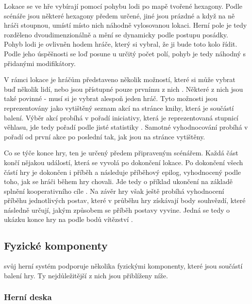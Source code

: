 Lokace se ve hře vybírají pomocí pohybu lodi po mapě tvořené hexagony. Podle scénáře jsou některé hexagony předem určené, jiné jsou prázdné a když na ně hráči stoupnou, umístí místo nich náhodně vylosovanou lokaci. Herní pole je tedy rozděleno dvoudimenzionálně a mění se dynamicky  podle postupu posádky. Pohyb lodi je ovlivněn hodem hráče, který si vybral, že ji bude toto kolo řídit. Podle jeho úspěšnosti se loď posune u určitý počet polí, pohyb je tedy náhodný  s přidanými modifikátory.

V rámci lokace je hráčům představeno několik možností, které si může vybrat buď několik lidí, nebo jsou přístupné pouze prvnímu z nich . Některé z nich jsou také povinné - musí si je vybrat alespoň jeden hráč. Tyto možnosti jsou reprezentovány jako vytištěný seznam akcí na stránce knihy, která je součástí balení. Výběr akcí probíhá v pořadí iniciativy, která je reprezentovaná stupnicí věhlasu, jde tedy pořadí podle jisté statistiky . Samotné vyhodnocování probíhá v pořadí od první akce po poslední tak, jak jsou na stránce vytištěny.

Co se týče konce hry, ten je určený předem připraveným scénářem. Každá část končí nějakou událostí, která se vyvolá po dokončení lokace. Po dokončení všech částí hry je dokončen i příběh a následuje příběhový epilog, vyhodnocený podle toho, jak se hráči během hry chovali. Jde tedy o příklad ukončení na základě splnění kooperativního cíle . Na závěr hry však ještě probíhá vyhodnocení příběhu jednotlivých postav, které v průběhu hry získávají body souhvězdí, které následně určují, jakým způsobem se příběh postavy vyvine. Jedná se tedy o ukázku konce hry na podle bodů vítězství .


\subsection{Fyzické komponenty}
\label{subsec:fw_components}

 svůj herní systém podporuje několika fyzickými komponenty, které jsou součástí balení hry. Ty nejdůležitější z nich jsou přiblíženy níže.

\subsubsection*{Herní deska}
\label{subsubsec:fw_comp_board_and_book}

